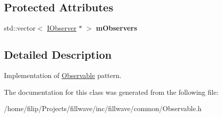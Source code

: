 \subsection*{Protected Attributes}
\begin{DoxyCompactItemize}
\item 
std\+::vector$<$ \hyperlink{classflw_1_1flf_1_1IObserver}{I\+Observer} $\ast$ $>$ {\bfseries m\+Observers}\hypertarget{classflw_1_1flf_1_1Observable_ab2195183e9d1cb1c5918cfccda9bbf49}{}\label{classflw_1_1flf_1_1Observable_ab2195183e9d1cb1c5918cfccda9bbf49}

\end{DoxyCompactItemize}


\subsection{Detailed Description}
Implementation of \hyperlink{classflw_1_1flf_1_1Observable}{Observable} pattern. 

The documentation for this class was generated from the following file\+:\begin{DoxyCompactItemize}
\item 
/home/filip/\+Projects/fillwave/inc/fillwave/common/Observable.\+h\end{DoxyCompactItemize}
